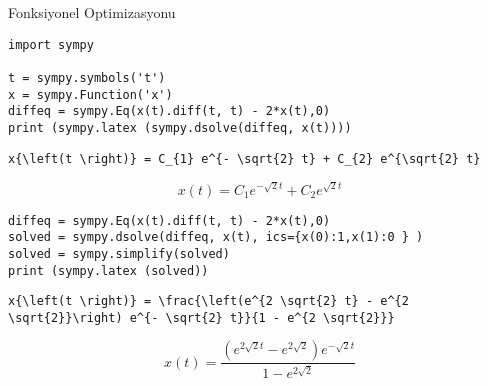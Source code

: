 \documentclass[12pt,fleqn]{article}\usepackage{../../common}
\begin{document}
Fonksiyonel Optimizasyonu

\begin{verbatim}
import sympy

t = sympy.symbols('t')
x = sympy.Function('x')
diffeq = sympy.Eq(x(t).diff(t, t) - 2*x(t),0)
print (sympy.latex (sympy.dsolve(diffeq, x(t))))
\end{verbatim}

\begin{verbatim}
x{\left(t \right)} = C_{1} e^{- \sqrt{2} t} + C_{2} e^{\sqrt{2} t}
\end{verbatim}

$$
x{\left(t \right)} = C_{1} e^{- \sqrt{2} t} + C_{2} e^{\sqrt{2} t}
$$

\begin{verbatim}
diffeq = sympy.Eq(x(t).diff(t, t) - 2*x(t),0)
solved = sympy.dsolve(diffeq, x(t), ics={x(0):1,x(1):0 } ) 
solved = sympy.simplify(solved)
print (sympy.latex (solved))
\end{verbatim}

\begin{verbatim}
x{\left(t \right)} = \frac{\left(e^{2 \sqrt{2} t} - e^{2 \sqrt{2}}\right) e^{- \sqrt{2} t}}{1 - e^{2 \sqrt{2}}}
\end{verbatim}

$$
x{\left(t \right)} = \frac{\left(e^{2 \sqrt{2} t} - e^{2 \sqrt{2}}\right) e^{- \sqrt{2} t}}{1 - e^{2 \sqrt{2}}}
$$



\end{document}
